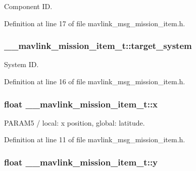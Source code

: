 Component I\-D. 



Definition at line 17 of file mavlink\-\_\-msg\-\_\-mission\-\_\-item.\-h.

\hypertarget{struct____mavlink__mission__item__t_ab6e5076aa5f0e524e88879bebf0ed483}{
\subsubsection[{target\-\_\-system}]{ \-\_\-\-\_\-mavlink\-\_\-mission\-\_\-item\-\_\-t\-::target\-\_\-system}}\label{struct____mavlink__mission__item__t_ab6e5076aa5f0e524e88879bebf0ed483}


System I\-D. 



Definition at line 16 of file mavlink\-\_\-msg\-\_\-mission\-\_\-item.\-h.

\hypertarget{struct____mavlink__mission__item__t_a578c43dbf85decd47437180c89407f93}{
\subsubsection[{x}]{\setlength{\rightskip}{0pt plus 5cm}float \-\_\-\-\_\-mavlink\-\_\-mission\-\_\-item\-\_\-t\-::x}}\label{struct____mavlink__mission__item__t_a578c43dbf85decd47437180c89407f93}


P\-A\-R\-A\-M5 / local\-: x position, global\-: latitude. 



Definition at line 11 of file mavlink\-\_\-msg\-\_\-mission\-\_\-item.\-h.

\hypertarget{struct____mavlink__mission__item__t_a916e8ea61a94ce7b854ebd11cc5eea37}{
\subsubsection[{y}]{\setlength{\rightskip}{0pt plus 5cm}float \-\_\-\-\_\-mavlink\-\_\-mission\-\_\-item\-\_\-t\-::y}}\label{struct____mavlink__mission__item__t_a916e8ea61a94ce7b854ebd11cc5eea37}


